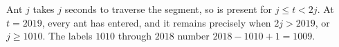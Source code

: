 Ant $j$ takes $j$ seconds to traverse the segment, so is present for $j\le t<2j$. At $t=2019$, every ant has entered, and it remains precisely when $2j>2019$, or $j\ge1010$. The labels $1010$ through $2018$ number $2018-1010+1=\boxed{1009}$.
